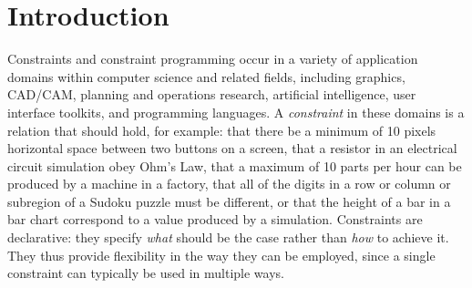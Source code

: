 \section{Introduction}
\label{sec:introduction}




Constraints and constraint programming occur in a variety of
application domains within computer science and related fields,
including graphics, CAD/CAM, planning and operations research,
artificial intelligence, user interface toolkits, and programming
languages. A \emph{constraint} in these domains is a relation that
should hold, for example: that there be a minimum of 10 pixels
horizontal space between two buttons on a screen, that a resistor in
an electrical circuit simulation obey Ohm's Law, that a maximum of 10
parts per hour can be produced by a machine in a factory, that all of
the digits in a row or column or subregion of a Sudoku puzzle must be
different, or that the height of a bar in a bar chart correspond to a
value produced by a simulation. Constraints are declarative: they
specify \emph{what} should be the case rather than \emph{how} to
achieve it.  They thus provide flexibility in the way they can be
employed, since a single constraint can typically be used in multiple ways.

